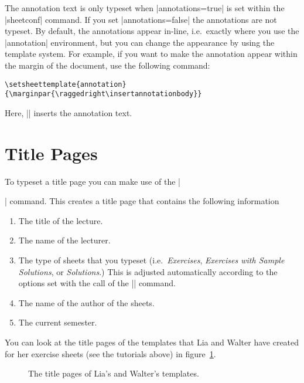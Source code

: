 \documentclass[a4paper,fleqn]{report}
\begin{document}
\noindent The annotation text is only typeset when |annotations=true|
is set within the |sheetconf| command. If you set |annotations=false|
the annotations are not typeset. By default, the annotations appear
in-line, i.e.\ exactly where you use the |annotation| environment, but
you can change the appearance by using the template system. For
example, if you want to make the annotation appear within the margin
of the document, use the following command:

\begin{lstlisting}
\setsheettemplate{annotation}{\marginpar{\raggedright\insertannotationbody}}
\end{lstlisting}
Here, |\insertannotationbody| inserts the annotation text.


\section{Title Pages}

To typeset a title page you can make use of the |\maketitle| command.
This creates a title page that contains the following information
\begin{enumerate}
  \item The title of the lecture.
  \item The name of the lecturer.
  \item The type of sheets that you typeset (i.e.\ 
    \emph{Exercises},
    \emph{Exercises with Sample Solutions}, or 
    \emph{Solutions}.) This is adjusted automatically according to the
      options set with the call of the |\sheetconf| command.
  \item The name of the author of the sheets.
  \item The current semester.
\end{enumerate}

\noindent You can look at the title pages of the templates that Lia
and Walter have created for her exercise sheets (see the tutorials
above) in figure~\ref{fig:template_title_pages}.

\begin{figure}[htbp]
  \centering
  \quad
  \caption{The title pages of Lia's and Walter's templates.}
  \label{fig:template_title_pages}
\end{figure}
\end{document}
